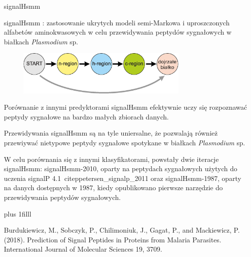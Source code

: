 \documentclass{beamer}\usepackage[]{graphicx}\usepackage[]{color}
\newcommand{\btVFill}{\vskip0pt plus 1filll}
\begin{document}
\begin{frame}{signalHsmm}

signalHsmm \citep{BurdukiewiczPredictionSignalPeptides2018}: zastosowanie ukrytych modeli semi-Markowa i uproszczonych alfabetów aminokwasowych w celu przewidywania peptydów sygnałowych w białkach \textit{Plasmodium} sp.

\begin{figure} 
\includegraphics[width=0.75\textwidth]{static_figure/HSMMs.eps}
\end{figure}

\end{frame}

\begin{frame}{Porównanie z innymi predyktorami}
signalHsmm efektywnie uczy się rozpoznawać peptydy sygnałowe na bardzo małych zbiorach danych.

Przewidywania signalHsmm są na tyle uniersalne, że pozwalają również przewiywać nietypowe peptydy sygnałowe spotykane w białkach \textit{Plasmodium} sp.

W celu porównania się z innymi klasyfikatorami, powstały dwie iteracje signalHsmm: signalHsmm-2010, oparty na peptydach sygnałowych użytych do uczenia signalP 4.1~citep{petersen_signalp_2011} oraz signalHsmm-1987, oparty na danych dostępnych w 1987, kiedy opublikowano pierwsze narzędzie do przewidywania peptydów sygnałowych.

\btVFill

\tiny Burdukiewicz, M., Sobczyk, P., Chilimoniuk, J., Gagat, P., and Mackiewicz, P. (2018). Prediction of Signal Peptides in Proteins from Malaria Parasites. International Journal of Molecular Sciences 19, 3709.

\end{frame}
\end{document}
